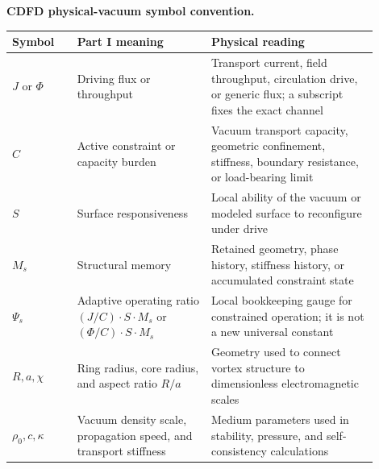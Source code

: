 \documentclass[11pt]{article}
\begin{document}
\noindent\textbf{CDFD physical-vacuum symbol convention.}
\begin{center}
{\small
\begin{tabular}{p{0.16\linewidth}p{0.33\linewidth}p{0.41\linewidth}}
\hline
Symbol & Part I meaning & Physical reading \\
\hline
$J$ or $\Phi$ & Driving flux or throughput & Transport current, field throughput, circulation drive, or generic flux; a subscript fixes the exact channel \\
$C$ & Active constraint or capacity burden & Vacuum transport capacity, geometric confinement, stiffness, boundary resistance, or load-bearing limit \\
$S$ & Surface responsiveness & Local ability of the vacuum or modeled surface to reconfigure under drive \\
$M_s$ & Structural memory & Retained geometry, phase history, stiffness history, or accumulated constraint state \\
$\Psi_s$ & Adaptive operating ratio $(J/C)\cdot S\cdot M_s$ or $(\Phi/C)\cdot S\cdot M_s$ & Local bookkeeping gauge for constrained operation; it is not a new universal constant \\
$R,a,\chi$ & Ring radius, core radius, and aspect ratio $R/a$ & Geometry used to connect vortex structure to dimensionless electromagnetic scales \\
$\rho_0,c,\kappa$ & Vacuum density scale, propagation speed, and transport stiffness & Medium parameters used in stability, pressure, and self-consistency calculations \\
\hline
\end{tabular}
}
\end{center}
\end{document}
